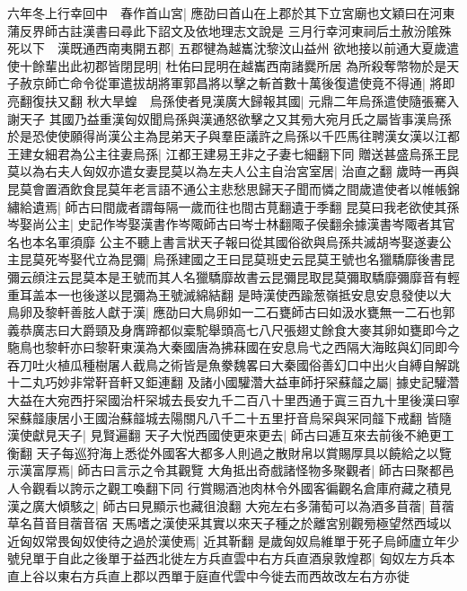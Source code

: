 六年冬上行幸回中　春作首山宮|{
	應劭曰首山在上郡於其下立宮廟也文穎曰在河東蒲反界師古註漢書曰尋此下詔文及依地理志文說是}
三月行幸河東祠后土赦汾隂殊死以下　漢既通西南夷開五郡|{
	五郡犍為越巂沈黎汶山益州}
欲地接以前通大夏歲遣使十餘輩出此初郡皆閉昆明|{
	杜佑曰昆明在越巂西南諸爨所居}
為所殺奪幣物於是天子赦京師亡命令從軍遣拔胡將軍郭昌將以擊之斬首數十萬後復遣使竟不得通|{
	將即亮翻復扶又翻}
秋大旱蝗　烏孫使者見漢廣大歸報其國|{
	元鼎二年烏孫遣使隨張騫入謝天子}
其國乃益重漢匈奴聞烏孫與漢通怒欲擊之又其㫄大宛月氏之屬皆事漢烏孫於是恐使使願得尚漢公主為昆弟天子與羣臣議許之烏孫以千匹馬往聘漢女漢以江都王建女細君為公主往妻烏孫|{
	江都王建易王非之子妻七細翻下同}
贈送甚盛烏孫王昆莫以為右夫人匈奴亦遣女妻昆莫以為左夫人公主自治宮室居|{
	治直之翻}
歲時一再與昆莫會置酒飲食昆莫年老言語不通公主悲愁思歸天子聞而憐之間歲遣使者以帷帳錦繡給遺焉|{
	師古曰間歲者謂每隔一歲而往也間古莧翻遺于季翻}
昆莫曰我老欲使其孫岑娶尚公主|{
	史記作岑娶漢書作岑陬師古曰岑士林翻陬子侯翻余據漢書岑陬者其官名也本名軍須靡}
公主不聽上書言狀天子報曰從其國俗欲與烏孫共滅胡岑娶遂妻公主昆莫死岑娶代立為昆彌|{
	烏孫建國之王曰昆莫班史云昆莫王號也名獵驕靡後書昆彌云顔注云昆莫本是王號而其人名獵驕靡故書云昆彌昆取昆莫彌取驕靡彌靡音有輕重耳盖本一也後遂以昆彌為王號滅綿結翻}
是時漢使西踰葱嶺抵安息安息發使以大鳥卵及黎軒善胘人獻于漢|{
	應劭曰大鳥卵如一二石甕師古曰如汲水甕無一二石也郭義恭廣志曰大爵頸及身膺蹄都似槖駝舉頭高七八尺張翅丈餘食大麥其卵如甕即今之駞鳥也黎軒亦曰黎靬東漢為大秦國唐為拂菻國在安息烏弋之西隔大海眩與幻同即今吞刀吐火植瓜種樹屠人截鳥之術皆是魚豢魏畧曰大秦國俗善幻口中出火自縛自解跳十二丸巧妙非常靬音軒又鉅連翻}
及諸小國驩濳大益車師扜罙蘇䪥之屬|{
	據史記驩濳大益在大宛西扜罙國治杆罙城去長安九千二百八十里西通于寘三百九十里後漢曰寧罙蘇䪥康居小王國治蘇䪥城去陽關凡八千二十五里扜音烏罙與冞同䪥下戒翻}
皆隨漢使獻見天子|{
	見賢遍翻}
天子大悦西國使更來更去|{
	師古曰逓互來去前後不絶更工衡翻}
天子每巡狩海上悉從外國客大都多人則過之散財帛以賞賜厚具以饒給之以覽示漢富厚焉|{
	師古曰言示之令其觀覽}
大角抵出奇戲諸怪物多聚觀者|{
	師古曰聚都邑人令觀看以誇示之觀工喚翻下同}
行賞賜酒池肉林令外國客徧觀名倉庫府藏之積見漢之廣大傾駭之|{
	師古曰見顯示也藏徂浪翻}
大宛左右多蒲萄可以為酒多苜蓿|{
	苜蓿草名苜音目蓿音宿}
天馬嗜之漢使采其實以來天子種之於離宮别觀㫄極望然西域以近匈奴常畏匈奴使待之過於漢使焉|{
	近其靳翻}
是歲匈奴烏維單于死子烏師廬立年少號兒單于自此之後單于益西北徙左方兵直雲中右方兵直酒泉敦煌郡|{
	匈奴左方兵本直上谷以東右方兵直上郡以西單于庭直代雲中今徙去而西故改左右方亦徙}


